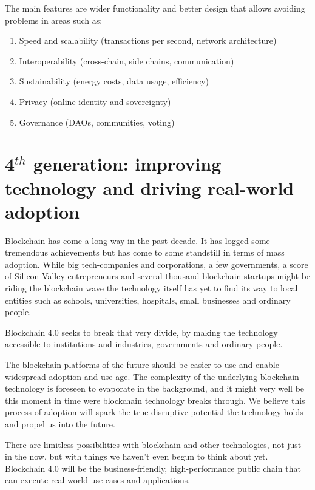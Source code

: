 The main features are wider functionality and better design that allows avoiding problems in areas such as:

 \begin{enumerate}[label=(\alph*)]
 \setlength\itemsep{0em}
        \item Speed and scalability (transactions per second, network architecture)
        \item Interoperability (cross-chain, side chains, communication)
        \item Sustainability (energy costs, data usage, efficiency)
        \item Privacy (online identity and sovereignty)
        \item Governance (DAOs, communities, voting)
\end{enumerate}

\section{\texorpdfstring{4$^{th}$ generation: improving technology and driving real-world adoption}{4th generation: improving technology and driving real-world adoption}}
Blockchain has come a long way in the past decade. It has logged some tremendous achievements but has come to some standstill in terms of mass adoption. While big tech-companies and corporations, a few governments, a score of Silicon Valley entrepreneurs and several thousand blockchain startups might be riding the blockchain wave the technology itself has yet to find its way to local entities such as schools, universities, hospitals, small businesses and ordinary people.

Blockchain 4.0 seeks to break that very divide, by making the technology accessible to institutions and industries, governments and ordinary people.

The blockchain platforms of the future should be easier to use and enable widespread adoption and use-age. The complexity of the underlying blockchain technology is foreseen to evaporate in the background, and it might very well be this moment in time were blockchain technology breaks through. We believe this process of adoption will spark the true disruptive potential the technology holds and propel us into the future. 

There are limitless possibilities with blockchain and other technologies, not just in the now, but with things we haven't even begun to think about yet. Blockchain 4.0 will be the business-friendly, high-performance public chain that can execute real-world use cases and applications.

